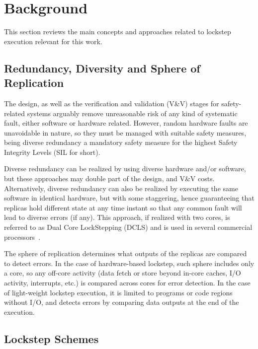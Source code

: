 \section{Background}
\label{sec:back}

This section reviews the main concepts and approaches related to lockstep execution relevant for this work.

\subsection{Redundancy, Diversity and Sphere of Replication}
The design, as well as the verification and validation (V\&V) stages for safety-related systems arguably remove unreasonable risk of any kind of systematic fault, either software or hardware related. However, random hardware faults are unavoidable in nature, so they must be managed with suitable safety measures, being diverse redundancy a mandatory safety measure for the highest Safety Integrity Levels (SIL for short).

Diverse redundancy can be realized by using diverse hardware and/or software, but these approaches may double part of the design, and V\&V costs. Alternatively, diverse redundancy can also be realized by executing the same software in identical hardware, but with some staggering, hence guaranteeing that replicas hold different state at any time instant so that any common fault will lead to diverse errors (if any). This approach, if realized with two cores, is referred to as Dual Core LockStepping (DCLS) and is used in several commercial processors~\cite{infineon_aurix,STlockstep,RendundancyASILD}.

The sphere of replication determines what outputs of the replicas are compared to detect errors. In the case of hardware-based lockstep, such sphere includes only a core, so any off-core activity (data fetch or store beyond in-core caches, I/O activity, interrupts, etc.) is compared across cores for error detection. In the case of light-weight lockstep execution, it is limited to programs or code regions without I/O, and detects errors by comparing data outputs at the end of the execution.


\subsection{Lockstep Schemes}

